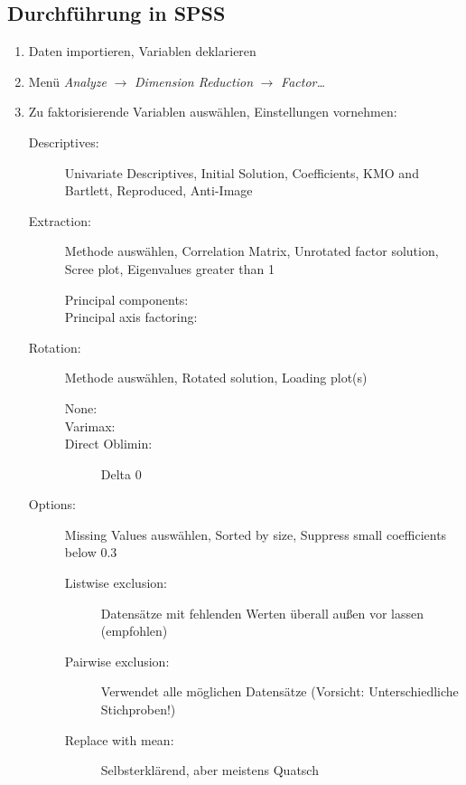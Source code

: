 \subsection{Durchführung in SPSS}
\begin{enumerate}
	\item Daten importieren, Variablen deklarieren
	\item Menü \textit{Analyze} $\rightarrow$ \textit{Dimension Reduction} $\rightarrow$ \textit{Factor\dots}
	\item Zu faktorisierende Variablen auswählen, Einstellungen vornehmen:
	\begin{description}
		\item[Descriptives:] Univariate Descriptives, Initial Solution, Coefficients, KMO and Bartlett, Reproduced, Anti-Image
		\item[Extraction:] Methode auswählen, Correlation Matrix, Unrotated factor solution, Scree plot, Eigenvalues greater than 1
		\begin{description}
			\item[Principal components:] 
			\item[Principal axis factoring:] 
		\end{description}
		\item[Rotation:] Methode auswählen, Rotated solution, Loading plot(s)
		\begin{description}
			\item[None:] 
			\item[Varimax:]
			\item[Direct Oblimin:] Delta 0
		\end{description}
		\item[Options:] Missing Values auswählen, Sorted by size, Suppress small coefficients below 0.3
		\begin{description}
			\item[Listwise exclusion:] Datensätze mit fehlenden Werten überall außen vor lassen (empfohlen)
			\item[Pairwise exclusion:] Verwendet alle möglichen Datensätze (Vorsicht: Unterschiedliche Stichproben!)
			\item[Replace with mean:] Selbsterklärend, aber meistens Quatsch
		\end{description}
	\end{description}
\end{enumerate}

